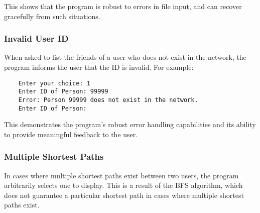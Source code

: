 This shows that the program is robust to errors in file input, and can recover gracefully from such situations.

\subsubsection{Invalid User ID}

When asked to list the friends of a user who does not exist in the network, the program informs the user that the ID is invalid. For example:

\begin{verbatim}
	Enter your choice: 1
	Enter ID of Person: 99999
	Error: Person 99999 does not exist in the network.
	Enter ID of Person: 
\end{verbatim}

This demonstrates the program's robust error handling capabilities and its ability to provide meaningful feedback to the user.

\subsubsection{Multiple Shortest Paths}

In cases where multiple shortest paths exist between two users, the program arbitrarily selects one to display. This is a result of the BFS algorithm, which does not guarantee a particular shortest path in cases where multiple shortest paths exist.
